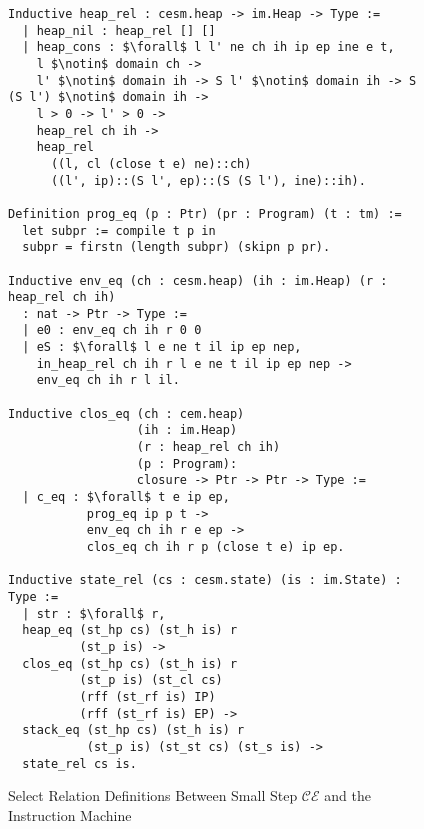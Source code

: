 \begin{figure}
\begin{lstlisting}
Inductive heap_rel : cesm.heap -> im.Heap -> Type := 
  | heap_nil : heap_rel [] [] 
  | heap_cons : $\forall$ l l' ne ch ih ip ep ine e t, 
    l $\notin$ domain ch -> 
    l' $\notin$ domain ih -> S l' $\notin$ domain ih -> S (S l') $\notin$ domain ih ->
    l > 0 -> l' > 0 -> 
    heap_rel ch ih -> 
    heap_rel 
      ((l, cl (close t e) ne)::ch) 
      ((l', ip)::(S l', ep)::(S (S l'), ine)::ih).

Definition prog_eq (p : Ptr) (pr : Program) (t : tm) := 
  let subpr := compile t p in 
  subpr = firstn (length subpr) (skipn p pr).

Inductive env_eq (ch : cesm.heap) (ih : im.Heap) (r : heap_rel ch ih)
  : nat -> Ptr -> Type :=
  | e0 : env_eq ch ih r 0 0 
  | eS : $\forall$ l e ne t il ip ep nep, 
    in_heap_rel ch ih r l e ne t il ip ep nep ->
    env_eq ch ih r l il.

Inductive clos_eq (ch : cem.heap) 
                  (ih : im.Heap) 
                  (r : heap_rel ch ih) 
                  (p : Program):
                  closure -> Ptr -> Ptr -> Type :=
  | c_eq : $\forall$ t e ip ep, 
           prog_eq ip p t -> 
           env_eq ch ih r e ep ->
           clos_eq ch ih r p (close t e) ip ep. 

Inductive state_rel (cs : cesm.state) (is : im.State) : Type := 
  | str : $\forall$ r, 
  heap_eq (st_hp cs) (st_h is) r 
          (st_p is) ->
  clos_eq (st_hp cs) (st_h is) r 
          (st_p is) (st_cl cs) 
          (rff (st_rf is) IP) 
          (rff (st_rf is) EP) ->
  stack_eq (st_hp cs) (st_h is) r 
           (st_p is) (st_st cs) (st_s is) ->
  state_rel cs is.
\end{lstlisting}
\caption{Select Relation Definitions Between Small Step $\mathcal{CE}$ and the
Instruction Machine}
\label{fig:state_rel}
\end{figure}


